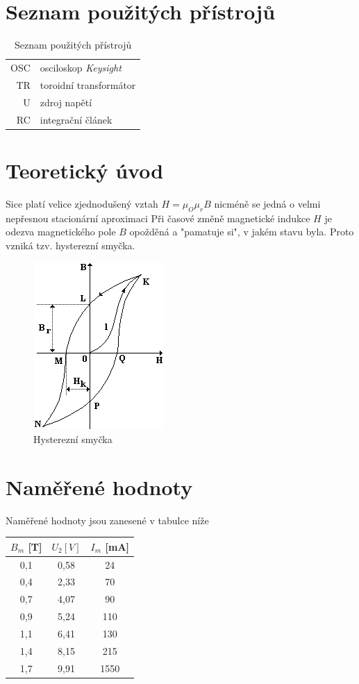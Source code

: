 \documentclass[a4paper,12pt]{article}   %
\begin{document}
\section{Seznam použitých přístrojů}
\label{chap:seznam_pristroju}
\begin{table}
  \begin{center}
    \begin{tabular}{rl}
      OSC & osciloskop \textit{Keysight}\\
      TR  & toroidní transformátor\\
      U   & zdroj napětí\\
      RC  & integrační článek\\
    \end{tabular}
  \end{center}
  \caption{Seznam použitých přístrojů}
\end{table}


\section{Teoretický úvod}
\label{chap:teoreticky_uvod}
Sice platí velice zjednodušený vztah $H=\mu_O\mu_rB$ nicméně se jedná o velmi nepřesnou stacionární aproximaci Při časové změně magnetické indukce $H$ je odezva magnetického pole $B$ opožděná a "pamatuje si", v jakém stavu byla. Proto vzniká tzv. hysterezní smyčka.
\begin{figure}
  \centering
  \includegraphics[width=.3\textwidth]{hyst.png}
  \caption{Hysterezní smyčka}
\end{figure}


\section{Naměřené hodnoty}
\label{chap:namerene_hodnoty}


Naměřené hodnoty jsou zanesené v tabulce níže
\begin{table}[h!]
  \centering
  \begin{tabular}{|c|c|c|}
  \hline
  $B_m$ [T] &$U_\text{2} [V]$& $I_m$ [mA]\\\hline\hline
  0,1 & 0,58  & 24   \\ \hline
  0,4 & 2,33  & 70   \\ \hline
  0,7 & 4,07  & 90   \\ \hline
  0,9 & 5,24  & 110  \\ \hline
  1,1 & 6,41  & 130  \\ \hline
  1,4 & 8,15  & 215  \\ \hline
  1,7 & 9,91  & 1550 \\ \hline
  \end{tabular}
\end{table}
\end{document}

